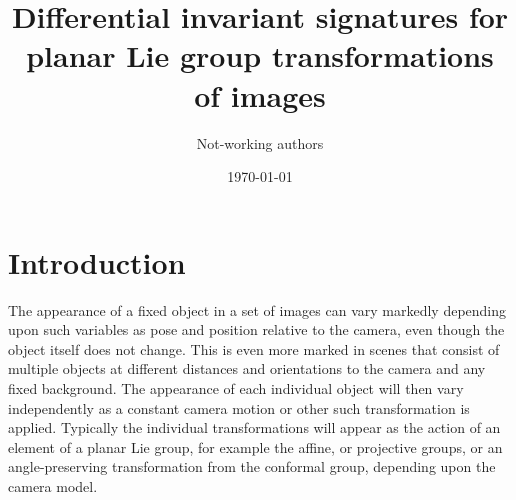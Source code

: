 \documentclass[review,onefignum,onetabnum]{siamonline190516}
\date{\today}
\title{Differential invariant signatures for planar Lie group transformations of images}
\author{Not-working authors }
\begin{document}
\maketitle
\begin{abstract}
\end{abstract}


\begin{keywords}

\end{keywords}

\begin{AMS}

\end{AMS}

\section{Introduction}


The appearance of a fixed object in a set of images can vary markedly depending upon such variables as pose and position relative to the camera, even though the object itself does not change. This is even more marked in scenes that consist of multiple objects at different distances and orientations to the camera and any fixed background. The appearance of each individual object will then vary independently as a constant camera motion or other such transformation is applied. Typically the individual transformations will appear as the action of an element of a planar Lie group, for example the affine, or projective groups, or an angle-preserving transformation from the conformal group, depending upon the camera model. %
\end{document}
